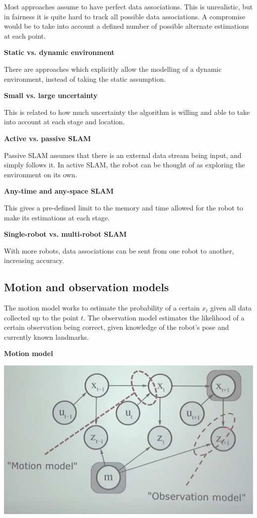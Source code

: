 \documentclass[a4paper]{article}
\begin{document}
Most approaches assume to have perfect data associations. This is unrealistic, but in fairness it is quite hard to track all possible data associations. A compromise would be to take into account a defined number of possible alternate estimations at each point.

\textbf{Static vs. dynamic environment}

There are approaches which explicitly allow the modelling of a dynamic environment, instead of taking the static assumption.

\textbf{Small vs. large uncertainty}

This is related to how much uncertainty the algorithm is willing and able to take into account at each stage and location.

\textbf{Active vs. passive SLAM}

Passive SLAM assumes that there is an external data stream being input, and simply follows it. In active SLAM, the robot can be thought of as exploring the environment on its own.

\textbf{Any-time and any-space SLAM}

This gives a pre-defined limit to the memory and time allowed for the robot to make its estimations at each stage.

\textbf{Single-robot vs. multi-robot SLAM}

With more robots, data associations can be sent from one robot to another, increasing accuracy.

\subsection{Motion and observation models}

The motion model works to estimate the probability of a certain $x_t$ given all data collected up to the point $t$. The observation model estimates the likelihood of a certain observation being correct, given knowledge of the robot's pose and currently known landmarks.

\textbf{Motion model}

\begin{center}
\includegraphics[scale=0.5]{motandobs}
\end{center}
\end{document}

